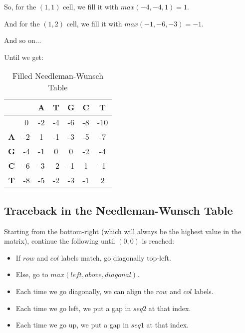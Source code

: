 So, for the $(1,1)$ cell, we fill it with $max(-4,-4,1) = 1$.

And for the $(1,2)$ cell, we fill it with $max(-1,-6,-3) = -1$.

And so on...

Until we get:

\begin{table}[htbp]
    \centering
    \begin{tabular}{|c|c|c|c|c|c|c|}
        \hline
          &  & \textbf{A} & \textbf{T} & \textbf{G} & \textbf{C} & \textbf{T} \\
        \hline
        & 0 & -2 & -4 & -6 & -8 & -10 \\
        \hline
        \textbf{A} & -2 & 1 & -1 & -3 & -5 & -7 \\
        \hline
        \textbf{G} & -4 & -1 & 0 & 0 & -2 & -4 \\
        \hline
        \textbf{C} & -6 & -3 & -2 & -1 & 1 & -1 \\
        \hline
        \textbf{T} & -8 & -5 & -2 & -3 & -1 & 2 \\
        \hline
    \end{tabular}
    \caption{Filled Needleman-Wunsch Table}
\end{table}

\subsection{Traceback in the Needleman-Wunsch Table}

Starting from the bottom-right (which will always be the highest value in the matrix),
continue the following until $(0,0)$ is reached:

\begin{itemize}
    \item If $row$ and $col$ labels match, go diagonally top-left.

    \item Else, go to $max(left,above,diagonal)$.
    
    \item Each time we go diagonally, we can align the $row$ and $col$ labels.

    \item Each time we go left, we put a gap in $seq2$ at that index.

    \item Each time we go up, we put a gap in $seq1$ at that index.

\end{itemize}

